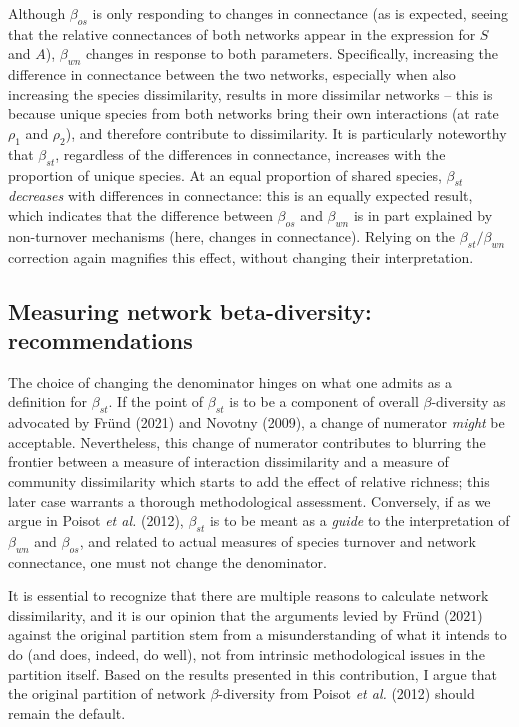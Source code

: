 \documentclass[11pt]{article}
\begin{document}
Although \(\beta_{os}\) is only responding to changes in connectance (as
is expected, seeing that the relative connectances of both networks
appear in the expression for \(S\) and \(A\)), \(\beta_{wn}\) changes in
response to both parameters. Specifically, increasing the difference in
connectance between the two networks, especially when also increasing
the species dissimilarity, results in more dissimilar networks -- this
is because unique species from both networks bring their own
interactions (at rate \(\rho_1\) and \(\rho_2\)), and therefore
contribute to dissimilarity. It is particularly noteworthy that
\(\beta_{st}\), regardless of the differences in connectance, increases
with the proportion of unique species. At an equal proportion of shared
species, \(\beta_{st}\) \emph{decreases} with differences in
connectance: this is an equally expected result, which indicates that
the difference between \(\beta_{os}\) and \(\beta_{wn}\) is in part
explained by non-turnover mechanisms (here, changes in connectance).
Relying on the \(\beta_{st}/\beta_{wn}\) correction again magnifies this
effect, without changing their interpretation.

\hypertarget{measuring-network-beta-diversity-recommendations}{%
\subsection{Measuring network beta-diversity:
recommendations}\label{measuring-network-beta-diversity-recommendations}}

The choice of changing the denominator hinges on what one admits as a
definition for \(\beta_{st}\). If the point of \(\beta_{st}\) is to be a
component of overall \(\beta\)-diversity as advocated by Fründ (2021)
and Novotny (2009), a change of numerator \emph{might} be acceptable.
Nevertheless, this change of numerator contributes to blurring the
frontier between a measure of interaction dissimilarity and a measure of
community dissimilarity which starts to add the effect of relative
richness; this later case warrants a thorough methodological assessment.
Conversely, if as we argue in Poisot \emph{et al.} (2012),
\(\beta_{st}\) is to be meant as a \emph{guide} to the interpretation of
\(\beta_{wn}\) and \(\beta_{os}\), and related to actual measures of
species turnover and network connectance, one must not change the
denominator.

It is essential to recognize that there are multiple reasons to
calculate network dissimilarity, and it is our opinion that the
arguments levied by Fründ (2021) against the original partition stem
from a misunderstanding of what it intends to do (and does, indeed, do
well), not from intrinsic methodological issues in the partition itself.
Based on the results presented in this contribution, I argue that the
original partition of network \(\beta\)-diversity from Poisot \emph{et
al.} (2012) should remain the default.
\end{document}

